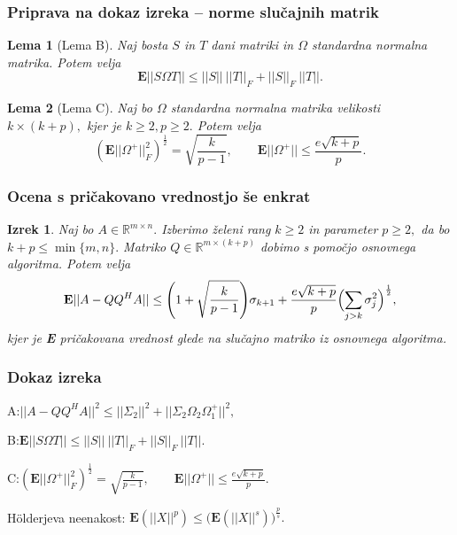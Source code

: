 \documentclass{beamer}
\newtheorem{izrek}{Izrek}
\newtheorem{lema}{Lema}
\begin{document}
\begin{frame}
\frametitle{Priprava na dokaz izreka -- norme slučajnih matrik}

\begin{lema}[Lema B]
Naj bosta $S$ in $T$ dani matriki in $\Omega$ standardna normalna matrika. Potem velja %
$$\textbf{E} ||S \Omega T || \leq ||S||\ ||T||_F + ||S||_F  \ ||T||.$$
\end{lema}
\pause
\begin{lema}[Lema C]
Naj bo $\Omega$ standardna normalna matrika velikosti $k \times (k+p),$ kjer je $k \geq 2, p \geq 2.$ Potem velja $$(\textbf{E} ||\Omega^+ ||_F^2)^{\frac{1}{2}} = \sqrt{\frac{k}{p-1}}, \qquad\textbf{E} || \Omega^+ || \leq \frac{e\sqrt{k + p}}{p}.$$
\end{lema}

\end{frame}
\begin{frame}
\frametitle{Ocena s pričakovano vrednostjo še enkrat}

\begin{izrek}
Naj bo $A \in \mathbb{R}^{m \times n}.$ Izberimo želeni rang $k \geq 2$ in parameter $p \geq 2,$ da bo $k+p \leq \min\{m,n\}.$ Matriko $Q  \in \mathbb{R}^{m \times (k+p)}$ dobimo s pomočjo osnovnega algoritma. Potem velja 
$$\textbf{E}||A - QQ^HA|| \leq \Biggl (1 + \sqrt{\frac{k}{p-1}} \Biggr ) \sigma_{k+1} + \frac{e\sqrt{k+p}}{p} \Bigl ( \sum_{j>k} \sigma_j^2 \Bigr)^{\frac{1}{2}},$$
kjer je \textbf{E} pričakovana vrednost glede na slučajno matriko iz osnovnega algoritma.
\end{izrek}

\end{frame}
\begin{frame}
\frametitle{Dokaz izreka}
A:$||A - QQ^HA||^2 \leq ||\Sigma_2||^2 + ||\Sigma_2 \Omega_2 \Omega_1^+||^2,$
 
B:$\textbf{E} ||S \Omega T || \leq ||S||\ ||T||_F + ||S||_F  \ ||T||.$

C:$(\textbf{E} ||\Omega^+ ||_F^2)^{\frac{1}{2}} = \sqrt{\frac{k}{p-1}}, \qquad\textbf{E} || \Omega^+ || \leq \frac{e\sqrt{k + p}}{p}.$

H\"olderjeva neenakost:  $\textbf{E}(||X||^p) \leq \bigl ( \textbf{E}(||X||^s) \bigr ) ^{\frac{p}{s}}.$
\newline \newline \newline \newline \newline \newline \newline \newline \newline \newline \newline \newline\newline \newline \newline \newline
\end{frame}
\end{document}
